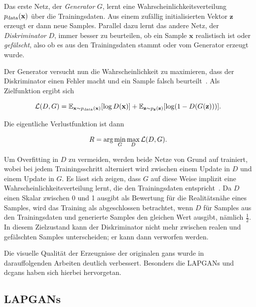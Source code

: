 Das erste Netz, der \emph{Generator} $ G $, lernt eine Wahrscheinlichkeitsverteilung $ p_{\textup{data}}(\mathbf{x}) $ über die Trainingsdaten.
Aus einem zufällig initialisierten Vektor $ \mathbf{z} $ erzeugt er dann neue Samples.
Parallel dazu lernt das andere Netz, der \emph{Diskriminator} $ D $, immer besser zu beurteilen, ob ein Sample $ \mathbf{x} $ realistisch ist oder \emph{gefälscht}, also ob es aus den Trainingsdaten stammt oder vom Generator erzeugt wurde.

Der Generator versucht nun die Wahrscheinlichkeit zu maximieren, dass der Diskriminator einen Fehler macht und ein Sample falsch beurteilt~\cite{Goodfellow.2014}.
Als Zielfunktion ergibt sich

\begin{equation}\label{eq:gan}
\mathcal{L}(D, G) = \mathbb{E}_{\mathbf{x} \sim p_{\textup{data}}(\mathbf{x})} [\log D(\mathbf{x})] + \mathbb{E}_{\mathbf{z} \sim p_{\mathbf{z}}(\mathbf{z})} [\log(1 - D(G(\mathbf{z})))].
\end{equation}

Die eigentliche Verlustfunktion ist dann

\begin{equation}\label{eq:ganrisk}
R = \textup{arg}\min_G \max_D \mathcal{L}(D, G).
\end{equation}

Um Overfitting in $ D $ zu vermeiden, werden beide Netze von Grund auf trainiert, wobei bei jedem Trainingsschritt alterniert wird zwischen einem Update in $ D $ und einem Update in $ G $.
Es lässt sich zeigen, dass $ G $ auf diese Weise implizit eine Wahrscheinlichkeitsverteilung lernt, die den Trainingsdaten entspricht~\cite{Goodfellow.2014}.
Da $ D $ einen Skalar zwischen 0 und 1 ausgibt als Bewertung für die Realitätsnähe eines Samples, wird das Training als abgeschlossen betrachtet, wenn $ D $ für Samples aus den Trainingsdaten und generierte Samples den gleichen Wert ausgibt, nämlich $ \frac{1}{2} $.
In diesem Zielzustand kann der Diskriminator nicht mehr zwischen realen und gefälschten Samples unterscheiden; er kann dann verworfen werden.

Die visuelle Qualität der Erzeugnisse der originalen \glspl{gan} wurde in darauffolgenden Arbeiten deutlich verbessert.
Besonders die LAPGANs und \glspl{dcgan} haben sich hierbei hervorgetan.



\subsection{LAPGANs}

